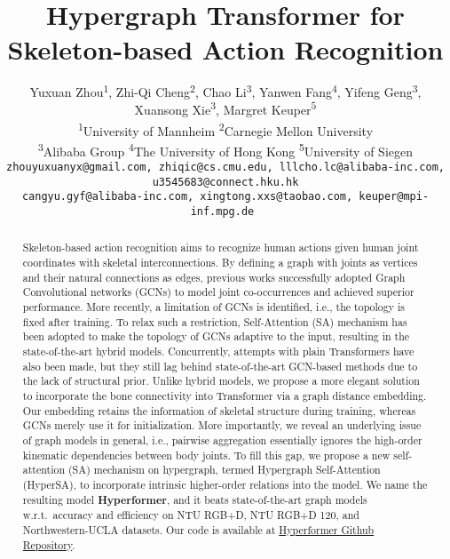 \documentclass[10pt,twocolumn,letterpaper]{article}
\begin{document}
\title{Hypergraph Transformer for Skeleton-based Action Recognition}




\author{Yuxuan Zhou\textsuperscript{$1$},
Zhi-Qi Cheng\textsuperscript{$2$},
Chao Li\textsuperscript{$3$},
Yanwen Fang\textsuperscript{$4$},
Yifeng Geng\textsuperscript{$3$},
Xuansong Xie\textsuperscript{$3$},
Margret Keuper\textsuperscript{$5$}\\
\textsuperscript{1}{University of Mannheim}
\textsuperscript{2}{Carnegie Mellon University}\\
\textsuperscript{3}{Alibaba Group}
\textsuperscript{4}{The University of Hong Kong}
\textsuperscript{5}{University of Siegen}\\
{\tt \small zhouyuxuanyx@gmail.com, zhiqic@cs.cmu.edu,
lllcho.lc@alibaba-inc.com, u3545683@connect.hku.hk}\\
{\tt \small cangyu.gyf@alibaba-inc.com, xingtong.xxs@taobao.com,
keuper@mpi-inf.mpg.de
}
}


\maketitle
\ificcvfinal\thispagestyle{empty}\fi

\begin{abstract}
Skeleton-based action recognition aims to recognize human actions given human joint coordinates with skeletal interconnections.
By defining a graph with joints as vertices and their natural connections as edges, previous works successfully adopted Graph Convolutional networks (GCNs) to model joint co-occurrences and achieved superior performance. More recently, a limitation of GCNs is identified, i.e., the topology is fixed after training. To relax such a restriction, Self-Attention (SA) mechanism has been adopted to make the topology of GCNs adaptive to the input, resulting in the state-of-the-art hybrid models. Concurrently, attempts with plain Transformers have also been made, but they still lag behind state-of-the-art GCN-based methods due to the lack of structural prior. Unlike hybrid models, we propose a more elegant solution to incorporate the bone connectivity into Transformer via a graph distance embedding. Our embedding retains the information of skeletal structure during training, whereas GCNs merely use it for initialization. 
More importantly, we reveal an underlying issue of graph models in general, i.e., pairwise aggregation essentially ignores the high-order kinematic dependencies between body joints. 
To fill this gap, we propose a new self-attention (SA) mechanism on hypergraph, termed Hypergraph Self-Attention (HyperSA), to incorporate intrinsic higher-order relations into the model. 
We name the resulting model \textbf{Hyperformer}, and it beats state-of-the-art graph models w.r.t.~accuracy and efficiency on NTU RGB+D, NTU RGB+D 120, and Northwestern-UCLA datasets. Our code is available at \href{https://github.com/ZhouYuxuanYX/Hypergraph-Transformer-for-Skeleton-based-Action-Recognition}{Hyperformer Github Repository}.
\end{abstract}
\end{document}
